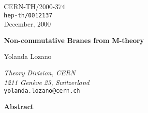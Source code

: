 \documentclass[12pt,a4paper]{article}
\begin{document}
\baselineskip16pt

\begin{flushright}
\footnotesize
\footnotesize
CERN-TH/2000-374\\
{\tt hep-th/0012137}\\
December, $2000$
\normalsize
\end{flushright}

\vspace{8mm}

\begin{center}



\vspace{.8cm}
{\Large \bf Non-commutative Branes from M-theory} 

\vspace{1cm}



Yolanda Lozano

\vspace{.5cm}

{
{\small \sl Theory Division, CERN\\
1211 Gen\`eve 23, Switzerland}\\
{\tt yolanda.lozano@cern.ch}
}

\vspace{.4cm}



\vspace{2cm}


{\bf Abstract}

\end{center}
\end{document}
